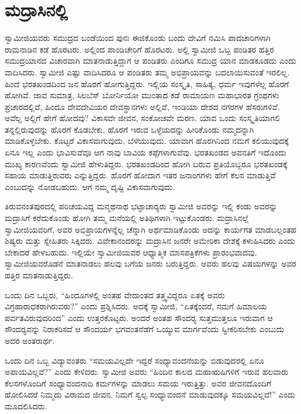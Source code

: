 
\chapter{ಮದ್ರಾಸಿನಲ್ಲಿ}

ಸ್ವಾಮೀಜಿಯವರು ಸಮುದ್ರದ ಬಂಡೆಯಿಂದ ಪುನಃ ಈಜಿಕೊಂಡು ಬಂದು ದೇವಿಗೆ ನಮಿಸಿ ಪಾದಚಾರಿಗಳಾಗಿ ರಾಮನಾಡಿನ ಕಡೆ ಹೊರಟರು. ಅಲ್ಲಿಂದ ಪಾಂಡಿಚೇರಿಗೆ ಹೊರಟರು. ಅಲ್ಲಿ ಸ್ವಾಮೀಜಿ ಒಬ್ಬ ಪಂಡಿತರ ಹತ್ತಿರ ಸಮುದ್ರಯಾನದ ವಿಚಾರವಾಗಿ ಮಾತನಾಡುತ್ತಿದ್ದಾಗ ಆ ಪಂಡಿತರು ಎಂದಿಗೂ ಸಮುದ್ರ ಯಾನ ಮಾಡಕೂಡದು ಎಂದು ವಾದಿಸಿದರು. ಸ್ವಾಮೀಜಿ ಎಷ್ಟು ವಾದಿಸಿದರೂ ಆ ಪಂಡಿತರು ತಮ್ಮ ಅಭಿಪ್ರಾಯವನ್ನು ಬದಲಾಯಿಸುವಂತೆ ಇರಲಿಲ್ಲ. ಹಿಂದೆ ಭರತಖಂಡದಿಂದ ಜನ ಹೊರಗೆ ಹೋಗುತ್ತಿದ್ದರು. ಇಲ್ಲಿಯ ಸಂಸ್ಕೃತಿ, ಸಾಹಿತ್ಯ, ಧರ್ಮ ಇವುಗಳೆಲ್ಲ ಹೊರಗೆ ಹೋಗಿವೆ. ಜಾವ ಸುಮಾತ್ರ, ಸಿಲಬೆಸ್ ಬೋರ್ನಿಯೋ ಮುಂತಾದ ಕಡೆ ರಾಮಾಯಣ ಮಹಾಭಾರತ ಗ್ರಂಥಗಳು ಪ್ರಚಾರದಲ್ಲಿವೆ, ಹಿಂದೂ ದೇವದೇವಿಯರ ದೇವಸ್ಥಾನಗಳು ಅಲ್ಲಿವೆ, ಇಂಡಿಯಾ ದೇಶದ ನಗರಗಳ ಹೆಸರುಗಳಿವೆ. ಅವೆಲ್ಲ ಅಲ್ಲಿಗೆ ಹೇಗೆ ಹೋದವು? ವಿಕಾಸವೇ ಜೀವನ, ಸಂಕೋಚವೇ ಮರಣ. ಯಾವ ಒಂದು ಸಂಸ್ಕೃತಿಯಾಗಲಿ ತನ್ನಲ್ಲಿರುವುದನ್ನು ಹೊರಗೆ ಕೊಡಬೇಕು. ಹೊರಗೆ ಇರುವ ಒಳ್ಳೆಯದನ್ನು ಹೀರಿಕೊಂಡು ನಮ್ಮದನ್ನಾಗಿ ಮಾಡಿಕೊಳ್ಳಬೇಕು. ಕೊಟ್ಟರೆ ವಿಕಾಸವಾಗುವುದು, ಬೆಳೆಯುವುದು. ಯಾವಾಗ ಹೊರಗಿನಿಂದ ನಮಗೆ ಕಲಿಯುವುದಕ್ಕೆ ಏನೂ ಇಲ್ಲ ಎಂದು ಭಾವಿಸುವೆವೂ ಆಗ ನಾವು ಬಾವಿಯ ಕಪ್ಪೆಗಳಾಗುವೆವು. ಭರತಖಂಡದ ಅವನತಿಗೆ ಇದೊಂದು ಮುಖ್ಯ ಕಾರಣವೆಂದು ಸ್ವಾಮೀಜಿ ಹೇಳುತಿದ್ದರು. ಭರತಖಂಡದಿಂದ ಹೋಗಿ ಬರುವ ಪ್ರತಿಯೊಬ್ಬರೂ ಭರತಖಂಡಕ್ಕೆ ಸಹಾಯ ಮಾಡುತ್ತಿರುವರು ಎನ್ನುತ್ತಿದ್ದರು. ಹೊರಗೆ ಹೋದಾಗ ಇತರ ಜನಾಂಗಗಳು ಹೇಗೆ ಕೆಲಸ ಮಾಡುತ್ತಿವೆ ಎಂಬುದನ್ನು ನೋಡಬಹುದು. ಆಗ ನಮ್ಮ ದೃಷ್ಟಿ ವಿಕಾಸವಾಗುವುದು. 

 ತಿರುವನಂತಪುರದಲ್ಲಿ ಪರಿಚಯವಿದ್ದ ಮನ್ಮಥನಾಥ ಭಟ್ಟಾಚಾರ‍್ಯರು ಸ್ವಾಮೀಜಿ ಅವರನ್ನು ಇಲ್ಲಿ ಕಂಡು ಅವರನ್ನು ಮದ್ರಾಸಿಗೆ ಕರೆದುಕೊಂಡು ಹೋಗಿ ತಮ್ಮ ಮನೆಯಲ್ಲಿ ಅತಿಥಿಗಳಾಗಿ ಇಟ್ಟುಕೊಂಡರು. ಮದ್ರಾಸಿನಲ್ಲೆ ಸ್ವಾಮೀಜಿಯವರಿಗೆ, ಅವರ ಅಭಿಪ್ರಾಯಗಳನ್ನೆಲ್ಲ ಚೆನ್ನಾಗಿ ಅರ್ಥಮಾಡಿಕೊಂಡು ಅದನ್ನು ಕಾರ್ಯಗತ ಮಾಡಬಲ್ಲಂತಹ ಶಿಷ್ಯರು ಮತ್ತು ಸ್ನೇಹಿತರು ಸಿಕ್ಕಿದರು. ವಿವೇಕಾನಂದರನ್ನು ಮದ್ರಾಸಿನ ಜನರೇ ಅಮೇರಿಕಾ ದೇಶಕ್ಕೆ ಕಳುಹಿಸಿದರು ಎಂದು ಬೇಕಾದರೆ ಹೇಳಬಹುದು. ಇಲ್ಲಿಯೇ ಸ್ವಾಮೀಜಿಯವರ ಆಧ್ಯಾತ್ಮಿಕ ಮಾಸಪತ್ರಿಕೆಗಳು ಪ್ರಾರಂಭವಾದವು. ಸ್ವಾಮೀಜಿಯವರೊಡನೆ ಮಾತನಾಡಲು ಹಲವು ಬಗೆಯ ಜನರು ಬರುತ್ತಿದ್ದರು. ಅವರು ಹಲವು ವಿಷಯಗಳನ್ನು ಅವರ ಹತ್ತಿರ ಮಾತನಾಡುತ್ತಿದ್ದರು. 

 ಒಂದು ದಿನ ಒಬ್ಬರು, “ಹಿಂದೂಗಳಲ್ಲಿ ಅಂತಹ ವೇದಾಂತದ ತತ್ತ್ವವಿದ್ದರೂ ಏತಕ್ಕೆ ಅವರು ವಿಗ್ರಹಾರಾಧಕರಾಗಿರುವರು?” ಎಂದು ಪ್ರಶ್ನಿಸಿದರು. ಅದಕ್ಕೆ ಸ್ವಾಮೀಜಿ, “ಏತಕ್ಕೆಂದರೆ, ನಮಗೆ ಹಿಮಾಲಯ ಪರ್ವತವಿರುವುದರಿಂದ” ಎಂದು ಉತ್ತರಕೊಟ್ಟರು. ಅಂದರೆ ಅಂತಹ ಸೌಂದರ‍್ಯ ಸುತ್ತಮುತ್ತಲೂ ಇರುವಾಗ ಆ ಸೌಂದರ‍್ಯವನ್ನು ನಿರಾಕರಿಸದೆ ಆ ಸೌಂದರ್ಯ ಭಗವಂತನೆಡೆಗೆ ಒಯ್ಯುವ ಮಾರ್ಗವೆಂದು ಸ್ವೀಕರಿಸಬೇಕು ಎಂಬುದು ಅದರ ಅಂತರಾರ್ಥ. 

 ಒಂದು ದಿನ ಒಬ್ಬ ವಿದ್ಯಾವಂತರು “ಸಮಯವಿಲ್ಲದೇ ಇದ್ದರೆ ಸಂಧ್ಯಾವಂದನೆಯನ್ನು ಬಿಡುವುದರಲ್ಲಿ ಏನೂ ಅಪಾಯವಿಲ್ಲವೆ?” ಎಂದು ಕೇಳಿದರು. ಸ್ವಾಮೀಜಿ ಅವರು “ಹಿಂದಿನ ಕಾಲದ ಮಹಾಋಷಿಗಳಿಗೆ ಇರುವ ಹಲವಾರು ಕೆಲಸಗಳೊಂದಿಗೆ ಸಂಧ್ಯಾವಂದನಾದಿ ಕರ್ಮಗಳನ್ನು ಮಾಡಲು ಸಮಯ ಇರುತ್ತಿತ್ತು. ಅವರ ಜೀವನದೊಂದಿಗೆ ಹೋಲಿಸಿದರೆ ನಿಮ್ಮದು ವಿರಾಮದ ಜೀವನ. ನಿಮಗೆ ಸ್ವಲ್ಪ ಸಂಧ್ಯಾವಂದನೆ ಮಾಡುವುದಕ್ಕೂ ಸಮಯವಿಲ್ಲವೆ!” ಎಂದು ಮೂದಲಿಸಿದರು. 

